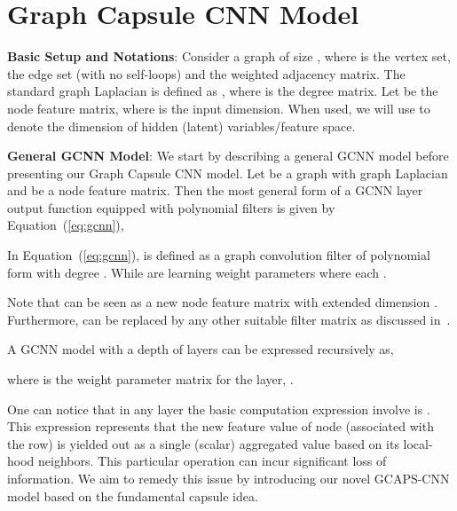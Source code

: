 \documentclass{article}
\begin{document}
\section{Graph Capsule CNN Model}\label{sec:model}

\noindent \textbf{Basic Setup and Notations}: Consider a   graph   of size , where  is  the vertex set,  the edge set (with no self-loops) and  the   weighted   adjacency matrix. The standard graph Laplacian is defined as , where  is the degree matrix. Let  be the node feature matrix, where  is the input dimension.  When used, we will use  to  denote the dimension of  hidden (latent) variables/feature space.

\noindent \textbf{General GCNN Model}: We start by describing a general GCNN model before presenting our Graph Capsule CNN model. Let   be a graph with graph  Laplacian   and  be a node feature matrix.  Then the most general form of a GCNN layer output function  equipped with polynomial filters  is given by Equation~(\ref{eq:gcnn}),



\vspace{-1em}




 
In Equation~(\ref{eq:gcnn}),   is defined as a graph convolution filter of polynomial form with degree . While  are learning weight parameters where each . 

Note that   can be seen as a new node feature matrix with extended dimension \footnotemark\label{fnm:1}. Furthermore,   can be replaced by any other suitable filter matrix as discussed in~\cite{levie2017cayleynets, kipf2016semi}.


A GCNN model with  a depth of   layers can  be  expressed recursively as, 



where  is the  weight parameter matrix for the layer, .

One can notice that in any layer the basic computation expression involve is . This expression represents that the new  feature value of   node  (associated   with the  row)  is yielded out as a single (scalar) aggregated value based on its local-hood neighbors. This particular operation can   incur significant loss of information. We aim to remedy this issue by introducing our novel GCAPS-CNN model based on   the fundamental capsule idea.
\end{document}
